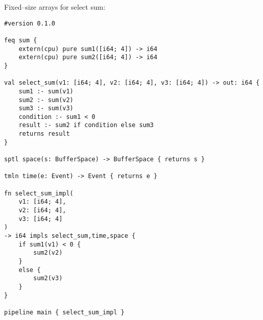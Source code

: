 Fixed--size arrays for select sum:

\begin{lstlisting}
#version 0.1.0

feq sum {
    extern(cpu) pure sum1([i64; 4]) -> i64
    extern(cpu) pure sum2([i64; 4]) -> i64
}

val select_sum(v1: [i64; 4], v2: [i64; 4], v3: [i64; 4]) -> out: i64 {
    sum1 :- sum(v1)
    sum2 :- sum(v2)
    sum3 :- sum(v3)
    condition :- sum1 < 0
    result :- sum2 if condition else sum3
    returns result
}

sptl space(s: BufferSpace) -> BufferSpace { returns s }

tmln time(e: Event) -> Event { returns e }

fn select_sum_impl(
    v1: [i64; 4], 
    v2: [i64; 4], 
    v3: [i64; 4]
) 
-> i64 impls select_sum,time,space {
    if sum1(v1) < 0 {
        sum2(v2)
    }
    else {
        sum2(v3)
    }
}

pipeline main { select_sum_impl }
\end{lstlisting}